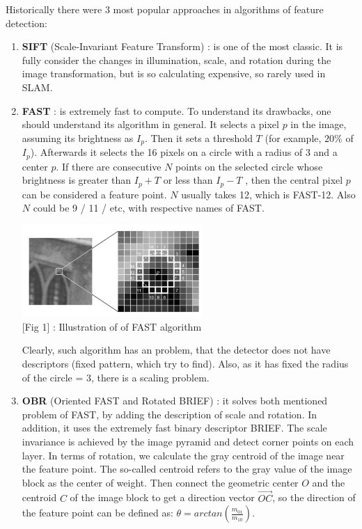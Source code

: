 Historically there were 3 most popular approaches in algorithms of feature detection:
\begin{enumerate}
    \item {\bf  SIFT} (Scale-Invariant Feature Transform) : is one of the most classic. It is fully consider the changes in illumination, scale, and rotation during the image transformation, but is so calculating expensive, so rarely used in SLAM.


    \item {\bf FAST} : is extremely fast to compute. To understand its drawbacks, one should understand its algorithm in general. It selects a  pixel $p$ in the image, assuming its brightness as $I_p$. Then it sets a threshold $T$ (for example, $20\%$ of $I_p$). Afterwards it selects the 16 pixels on a circle with a radius of 3 and a center $p$. If there are consecutive $N$ points on the selected circle whose brightness is greater than $I_p+T$ or less than $I_p−T$ , then the central pixel $p$ can be considered a feature point. $N$ usually takes 12, which is {\br FAST-12}. Also $N$ could be 9 / 11 / etc, with respective names of FAST.
    \begin{center}
        \includegraphics[height=3.5cm]{FAST_example.png}\\[1cm]
        [Fig 1] : Illustration of of FAST algorithm 
    \end{center}

    Clearly, such algorithm has an problem, that the detector does not have descriptors (fixed pattern, which try to find). Also, as it has fixed the radius of the circle = 3, there is a scaling problem.
    
    \item {\bf OBR}  (Oriented FAST and Rotated BRIEF) : it solves both mentioned problem of FAST, by adding the description of scale and rotation. In addition, it uses the extremely fast binary descriptor BRIEF. The scale invariance is achieved by the image pyramid and detect corner points on each layer. In terms of rotation, we calculate the gray centroid of the image near the feature point. The so-called centroid refers to the gray value of the image block as the center of weight. Then connect the geometric center $O$ and the centroid $C$ of the image block to get a direction vector $\overrightarrow{OC}$, so the direction of the feature point can be defined as: $\theta = arctan(\frac{m_{01}}{m_{10}})$.

\end{enumerate}


